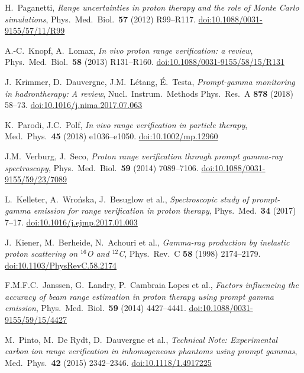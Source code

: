 \documentclass[a4paper]{article}
\begin{document}
\begin{thebibliography}{}

H.~Paganetti,
\emph{Range uncertainties in proton therapy and the role of Monte Carlo simulations},
Phys.\ Med.\ Biol.\ \textbf{57} (2012) R99--R117.
\href{https://doi.org/10.1088/0031-9155/57/11/R99}{doi:10.1088/0031-9155/57/11/R99}

A.-C.~Knopf, A.~Lomax,
\emph{In vivo proton range verification: a review},
Phys.\ Med.\ Biol.\ \textbf{58} (2013) R131--R160.
\href{https://doi.org/10.1088/0031-9155/58/15/R131}{doi:10.1088/0031-9155/58/15/R131}

J.~Krimmer, D.~Dauvergne, J.M.~L\'etang, \'E.~Testa,
\emph{Prompt-gamma monitoring in hadrontherapy: A review},
Nucl.\ Instrum.\ Methods Phys.\ Res.\ A \textbf{878} (2018) 58--73.
\href{https://doi.org/10.1016/j.nima.2017.07.063}{doi:10.1016/j.nima.2017.07.063}

K.~Parodi, J.C.~Polf,
\emph{In vivo range verification in particle therapy},
Med.\ Phys.\ \textbf{45} (2018) e1036--e1050.
\href{https://doi.org/10.1002/mp.12960}{doi:10.1002/mp.12960}

J.M.~Verburg, J.~Seco,
\emph{Proton range verification through prompt gamma-ray spectroscopy},
Phys.\ Med.\ Biol.\ \textbf{59} (2014) 7089--7106.
\href{https://doi.org/10.1088/0031-9155/59/23/7089}{doi:10.1088/0031-9155/59/23/7089}

L.~Kelleter, A.~Wrońska, J.~Besuglow et al.,
\emph{Spectroscopic study of prompt-gamma emission for range verification in proton therapy},
Phys.\ Med.\ \textbf{34} (2017) 7--17.
\href{https://doi.org/10.1016/j.ejmp.2017.01.003}{doi:10.1016/j.ejmp.2017.01.003}

J.~Kiener, M.~Berheide, N.~Achouri et al.,
\emph{Gamma-ray production by inelastic proton scattering on $^{16}$O and $^{12}$C},
Phys.\ Rev.\ C \textbf{58} (1998) 2174--2179.
\href{https://doi.org/10.1103/PhysRevC.58.2174}{doi:10.1103/PhysRevC.58.2174}

F.M.F.C.~Janssen, G.~Landry, P.~Cambraia Lopes et al.,
\emph{Factors influencing the accuracy of beam range estimation in proton therapy using prompt gamma emission},
Phys.\ Med.\ Biol.\ \textbf{59} (2014) 4427--4441.
\href{https://doi.org/10.1088/0031-9155/59/15/4427}{doi:10.1088/0031-9155/59/15/4427}

M.~Pinto, M.~De Rydt, D.~Dauvergne et al.,
\emph{Technical Note: Experimental carbon ion range verification in inhomogeneous phantoms using prompt gammas},
Med.\ Phys.\ \textbf{42} (2015) 2342--2346.
\href{https://doi.org/10.1118/1.4917225}{doi:10.1118/1.4917225}


\end{thebibliography}
\end{document}
